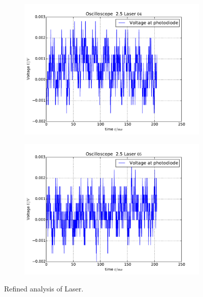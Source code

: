 \begin{figure}
\begin{subfigure}[b]{\picwidth}
        \includegraphics[width=\textwidth]{analysis/figures/25_laser04}
        \caption{}
        \label{fig:laser_e}
    \end{subfigure}
    \begin{subfigure}[b]{\picwidth}
        \includegraphics[width=\textwidth]{analysis/figures/25_laser05}
        \caption{}
        \label{fig:laser_f}
    \end{subfigure}
        \caption{Refined analysis of Laser.}
    \label{fig:laser}
\end{figure}

\clearpage
